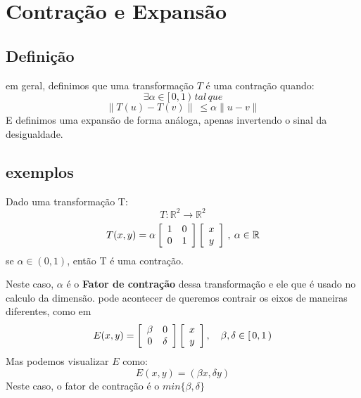 \section{Contração e Expansão}
\subsection{Definição}
\begin{definition}[contração]
    em geral, definimos que uma transformação \( T \) é uma contração quando:
        \[ 
        \exists \alpha \in [ \, 0,1\,) \, \, tal\, que
        \]
        \[
        \parallel T(u) - T(v) \parallel \: \leq \alpha \parallel u -v \parallel
        \]
    E definimos uma expansão de forma análoga, apenas invertendo o sinal da desigualdade.
    
\end{definition}

\subsection{exemplos}

\begin{proposition}\label{contract}
    Dado uma transformação T:
    \[
        T: \mathbb{R}^2 \longrightarrow \mathbb{R}^2
    \]
    \begin{equation}\label{escalar}
        T(x, y) = 
          \alpha
          \left[ 
            {
                \begin{array}{c c}
                    1 & 0 \\
                    0 & 1 \\
                \end{array} 
            } 
          \right]
          \left[ 
            {
                \begin{array}{c}
                    x \\
                    y \\
                \end{array} 
                } 
           \right]
           \, , \: \alpha \in \mathbb{R}
    \end{equation}
    se \( \alpha \in (0,1)\), então T é uma contração.
\end{proposition}
Neste caso, \(\alpha\) é o \textbf{Fator de contração} dessa transformação e ele que é usado no calculo da dimensão.
pode acontecer de queremos contrair os eixos de maneiras diferentes, como em
\[
E(x, y) = 
  \left[ 
    {
        \begin{array}{c c}
            \beta & 0      \\
            0     & \delta \\
        \end{array} 
    } 
  \right]
  \left[ 
    {
        \begin{array}{c}
            x \\
            y \\
        \end{array} 
        } 
   \right]
   ,
   \quad \beta,\delta \in [\,0, 1\,)
\]
Mas podemos visualizar \(E\) como:
\[
    E(x,y) = (\beta x, \delta y)
\]
Neste caso, o fator de contração é o \(min\{\beta, \delta\}\)
